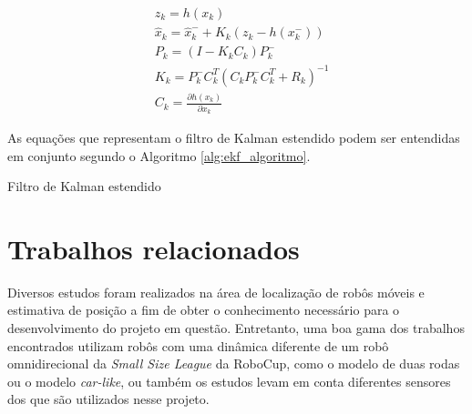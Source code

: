 \documentclass[acronym, symbols, table]{fei}
\begin{document}
			\begin{equation} \label{eq:equacao_medicao_ekf}
				\begin{split}
					&z_k = h(x_{k}) \\
					&\hat{x}_{k} = \hat{x}_{k}^{-} + K_{k}(z_k - h(x_{k}^{-})) \\
					&P_{k} = (I - K_{k}C_{k})P_{k}^{-} \\
					&K_k = P_{k}^{-}C_{k}^T(C_{k}P_{k}^{-}C_{k}^T + R_k)^{-1} \\
					&C_k = \frac{\partial h(x_k)}{\partial x_{k}}
				\end{split}
			\end{equation}
			
			As equações que representam o filtro de Kalman estendido podem ser entendidas em conjunto segundo o Algoritmo \ref{alg:ekf_algoritmo}.
			
			\begin{algorithm}
					\caption{Filtro de Kalman estendido}\label{alg:ekf_algoritmo}
			\end{algorithm}
			
\chapter{Trabalhos relacionados}\label{sec:trab_relacionados}
Diversos estudos foram realizados na área de localização de robôs móveis e estimativa de posição a fim de obter o conhecimento necessário para o desenvolvimento do projeto em questão. Entretanto, uma boa gama dos trabalhos encontrados utilizam robôs com uma dinâmica diferente de um robô omnidirecional da \textit{Small Size League} da RoboCup, como o modelo de duas rodas ou o modelo \textit{car-like}, ou também os estudos levam em conta diferentes sensores dos que são utilizados nesse projeto.
\end{document}
